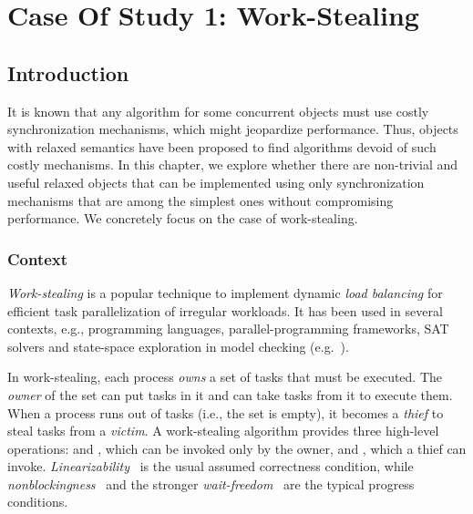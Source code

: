 \chapter{Case Of Study 1: Work-Stealing}

\section{Introduction}

It is known that any algorithm for some concurrent objects must use costly synchronization mechanisms, which might jeopardize performance. Thus, objects with relaxed semantics have been proposed to find algorithms devoid of such costly mechanisms. In this chapter, we explore whether there are non-trivial and useful relaxed objects that can be implemented using only synchronization mechanisms that are among the simplest ones without compromising performance.  We concretely focus on the case of work-stealing.

\subsection{Context}

\emph{Work-stealing} is a popular technique to implement dynamic \emph{load balancing} for efficient task parallelization of irregular workloads. It has been used in several contexts, e.g., programming languages, parallel-programming frameworks, SAT solvers and state-space exploration in model checking (e.g.~\cite{DBLP_journals_tpds_AyguadeCDHLMTUZ09, DBLP_journals_jpdc_BlumofeJKLRZ96, CGSDKEPS05, DBLP_conf_jvm_FloodDSZ01, DBLP_conf_pldi_FrigoLR98, DBLP_conf_java_Lea00, DBLP_conf_hpca_RangerRPBK07}).

In work-stealing, each process \emph{owns} a set of tasks that must be executed.  The \emph{owner} of the set can put tasks in it and can take tasks from it to execute them. When a process runs out of tasks (i.e., the set is empty), it becomes a \emph{thief} to steal tasks from a \emph{victim}. A work-stealing algorithm provides three high-level operations: \Put and \Take, which can be invoked only by the owner, and \Steal, which a thief can invoke. \emph{Linearizability}~\cite{DBLP_journals_toplas_HerlihyW90} is the usual assumed correctness condition, while \emph{nonblockingness}~\cite{DBLP_journals_toplas_HerlihyW90} and the stronger \emph{wait-freedom}~\cite{DBLP_conf_spaa_Herlihy91} are the typical  progress conditions.

